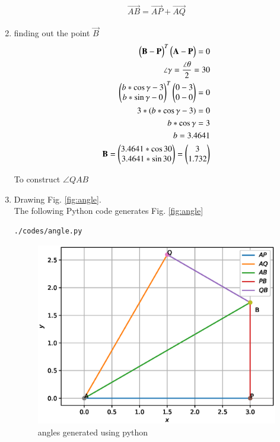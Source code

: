 \begin{enumerate}[label=\thesection.\arabic*.,ref=\thesection.\theenumi]
\begin{align}
\vec{AB} = \vec{AP} + \vec{AQ}
\end{align}
\item finding out the point $\vec{B}$
\\
\begin{align}
\begin{pmatrix}\mathbf{B} - \mathbf{P}\end{pmatrix}^T \begin{pmatrix}\mathbf{A} - \mathbf{P}\end{pmatrix} = 0
\\
\angle{\gamma} = \frac{\angle{\theta}}{2} = 30
\\
\begin{pmatrix}b*\cos{\gamma} - 3 \\ b*\sin{\gamma} - 0\end{pmatrix}^T \begin{pmatrix}0 - 3 \\ 0 - 0\end{pmatrix} = 0
\\
3*(b*\cos{\gamma} - 3) = 0
\\
b*\cos{\gamma} = 3
\\
b = 3.4641
\\
\mathbf{B} = \begin{pmatrix}3.4641*\cos{30}\\3.4641*\sin{30}\end{pmatrix} = \begin{pmatrix}3\\1.732\end{pmatrix}
\end{align}
\begin{table}[ht!]
	\centering
	
	\caption{To construct $\angle QAB$}
	\label{table:table1}	
\end{table}
\item Drawing  Fig. \ref{fig:angle}.	
\\
 The  following Python code generates Fig. \ref{fig:angle}
 \\
%
\begin{lstlisting}
./codes/angle.py
\end{lstlisting}
\begin{figure}[!ht]
\centering
\includegraphics[width=\columnwidth]{./figs/angle.eps}
\caption{angles generated using python}
\label{fig:angle_py}
\end{figure}


\end{enumerate}
